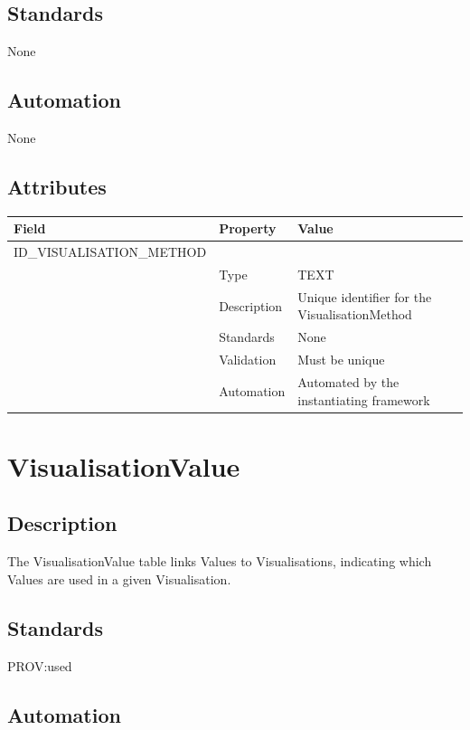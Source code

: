 \subsection{Standards}\label{standards-42}

None

\subsection{Automation}\label{automation-42}

None

\subsection{Attributes}\label{attributes-36}

\begin{longtable}[]{@{}lll@{}}
\toprule\noalign{}
Field & Property & Value \\
\midrule\noalign{}
\endhead
\bottomrule\noalign{}
\endlastfoot
ID\_VISUALISATION\_METHOD & & \\
& Type & TEXT \\
& Description & Unique identifier for the VisualisationMethod \\
& Standards & None \\
& Validation & Must be unique \\
& Automation & Automated by the instantiating framework \\
\end{longtable}

\section{VisualisationValue}\label{visualisationvalue}

\subsection{Description}\label{description-41}

The VisualisationValue table links Values to Visualisations, indicating
which Values are used in a given Visualisation.

\subsection{Standards}\label{standards-43}

PROV:used

\subsection{Automation}\label{automation-43}


